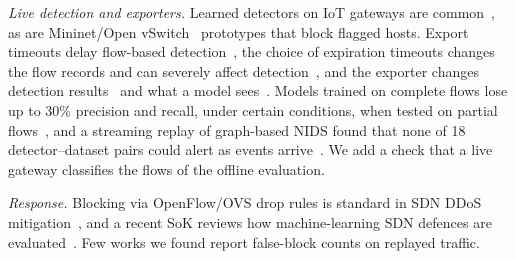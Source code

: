 \emph{Live detection and exporters.} Learned detectors on IoT gateways are common~\cite{realguard2022}, as are Mininet/Open vSwitch~\cite{lantz2010mininet,pfaff2015ovs} prototypes that block flagged hosts. Export timeouts delay flow-based detection~\cite{hofstede2013realtime}, the choice of expiration timeouts changes the flow records and can severely affect detection~\cite{velan2020impact}, and the exporter changes detection results~\cite{pinto2025flowexporter,pinto2025hera} and what a model sees~\cite{vitorino2025revisiting}. Models trained on complete flows lose up to 30\% precision and recall, under certain conditions, when tested on partial flows~\cite{pekar2025early}, and a streaming replay of graph-based NIDS found that none of 18 detector--dataset pairs could alert as events arrive~\cite{zhao2026gidseval}. We add a check that a live gateway classifies the flows of the offline evaluation.

\emph{Response.} Blocking via OpenFlow/OVS drop rules is standard in SDN DDoS mitigation~\cite{bawany2017ddos,yan2016sdn}, and a recent SoK reviews how machine-learning SDN defences are evaluated~\cite{orsdemir2026sok}. Few works we found report false-block counts on replayed traffic.
